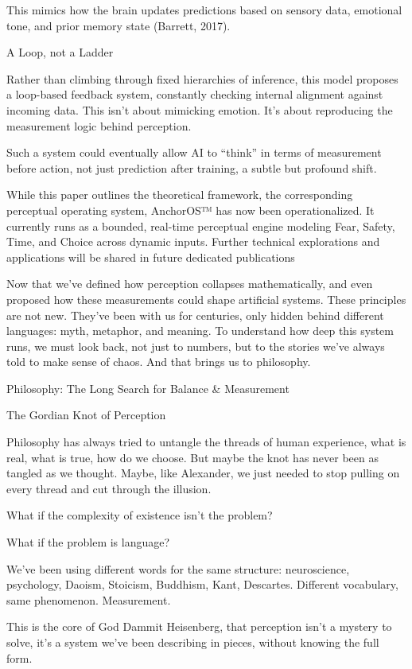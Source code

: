 \documentclass[11pt]{article}
\begin{document}
This mimics how the brain updates predictions based on sensory data, emotional tone, and prior memory state (Barrett, 2017).

A Loop, not a Ladder

Rather than climbing through fixed hierarchies of inference, this model proposes a loop-based feedback system, constantly checking internal alignment against incoming data. This isn’t about mimicking emotion. It’s about reproducing the measurement logic behind perception.

Such a system could eventually allow AI to “think” in terms of measurement before action, not just prediction after training, a subtle but profound shift.

While this paper outlines the theoretical framework, the corresponding perceptual operating system, AnchorOS™ has now been operationalized. It currently runs as a bounded, real-time perceptual engine modeling Fear, Safety, Time, and Choice across dynamic inputs. Further technical explorations and applications will be shared in future dedicated publications

Now that we’ve defined how perception collapses mathematically, and even proposed how these measurements could shape artificial systems. These principles are not new. They’ve been with us for centuries, only hidden behind different languages: myth, metaphor, and meaning. To understand how deep this system runs, we must look back, not just to numbers, but to the stories we’ve always told to make sense of chaos.
And that brings us to philosophy.

Philosophy: The Long Search for Balance & Measurement

The Gordian Knot of Perception

Philosophy has always tried to untangle the threads of human experience, what is real, what is true, how do we choose. But maybe the knot has never been as tangled as we thought. Maybe, like Alexander, we just needed to stop pulling on every thread and cut through the illusion.

What if the complexity of existence isn’t the problem?

What if the problem is language?

We’ve been using different words for the same structure: neuroscience, psychology, Daoism, Stoicism, Buddhism, Kant, Descartes. Different vocabulary, same phenomenon. Measurement.

This is the core of God Dammit Heisenberg, that perception isn’t a mystery to solve, it’s a system we’ve been describing in pieces, without knowing the full form.
\end{document}
